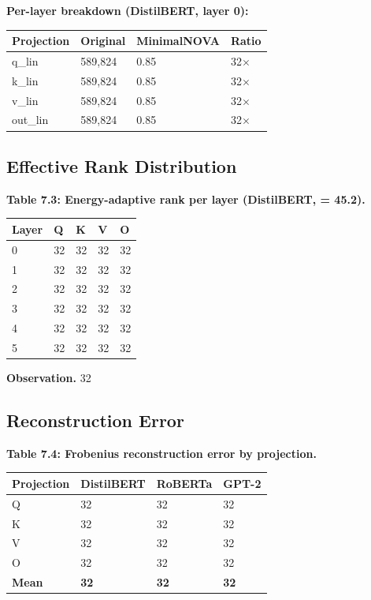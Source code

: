 \textbf{Per-layer breakdown (DistilBERT, layer 0):}

\begin{table}[H]
\centering
\small
\begin{tabular}{llll}
\toprule
\textbf{Projection} & \textbf{Original} & \textbf{MinimalNOVA} & \textbf{Ratio} \\
\midrule
q\_lin & 589,824 & 0.85 & 32$\times$ \\
k\_lin & 589,824 & 0.85 & 32$\times$ \\
v\_lin & 589,824 & 0.85 & 32$\times$ \\
out\_lin & 589,824 & 0.85 & 32$\times$ \\
\bottomrule
\end{tabular}
\end{table}

\subsection{Effective Rank Distribution}

\textbf{Table 7.3: Energy-adaptive rank per layer (DistilBERT,   = 45.2).}

\begin{table}[H]
\centering
\small
\begin{tabular}{lllll}
\toprule
\textbf{Layer} & \textbf{Q} & \textbf{K} & \textbf{V} & \textbf{O} \\
\midrule
0 & 32 & 32 & 32 & 32 \\
1 & 32 & 32 & 32 & 32 \\
2 & 32 & 32 & 32 & 32 \\
3 & 32 & 32 & 32 & 32 \\
4 & 32 & 32 & 32 & 32 \\
5 & 32 & 32 & 32 & 32 \\
\bottomrule
\end{tabular}
\end{table}

\textbf{Observation.} 32

\subsection{Reconstruction Error}

\textbf{Table 7.4: Frobenius reconstruction error by projection.}

\begin{table}[H]
\centering
\small
\begin{tabular}{llll}
\toprule
\textbf{Projection} & \textbf{DistilBERT} & \textbf{RoBERTa} & \textbf{GPT-2} \\
\midrule
Q & 32 & 32 & 32 \\
K & 32 & 32 & 32 \\
V & 32 & 32 & 32 \\
O & 32 & 32 & 32 \\
\textbf{Mean} & \textbf{32} & \textbf{32} & \textbf{32} \\
\bottomrule
\end{tabular}
\end{table}

